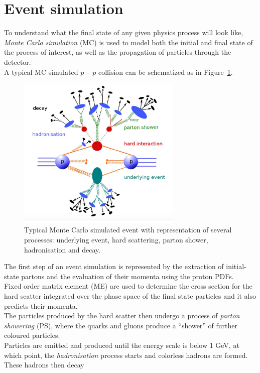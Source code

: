 \section{Event simulation}
To understand what the final state of any given physics process will look like,
\textit{Monte Carlo simulation} (MC) is used to model both the initial and final state of the 
process of interest, as well as the propagation of particles through the detector. \\
A typical MC simulated $p-p$ collision can be schematized as in Figure~\ref{fig:MC}.\\
\begin{figure}[!h]
	\centering
	\includegraphics[width=0.7\textwidth]{Chapters/CH4/figures/MC}
	\caption{Typical Monte Carlo simulated event with representation of several processes: underlying event, hard scattering, parton shower, hadronisation and decay.}
	\label{fig:MC}
\end{figure}
\noindent The first step of an event simulation is represented by the extraction of initial-state partons and the evaluation of their momenta using the proton PDFs.\\
Fixed order matrix element (ME) are used to determine the cross section for the hard scatter 
integrated over the phase space of the final state particles and it also predicts their momenta.\\
The particles produced by the hard scatter then undergo a process of \textit{parton showering} 
(PS), where the quarks and gluons produce a “shower” of further coloured particles.\\
Particles are emitted and produced until the energy scale is below 1 GeV, at which point, the 
\textit{hadronisation} process starts and colorless hadrons are formed. These hadrons then decay 
